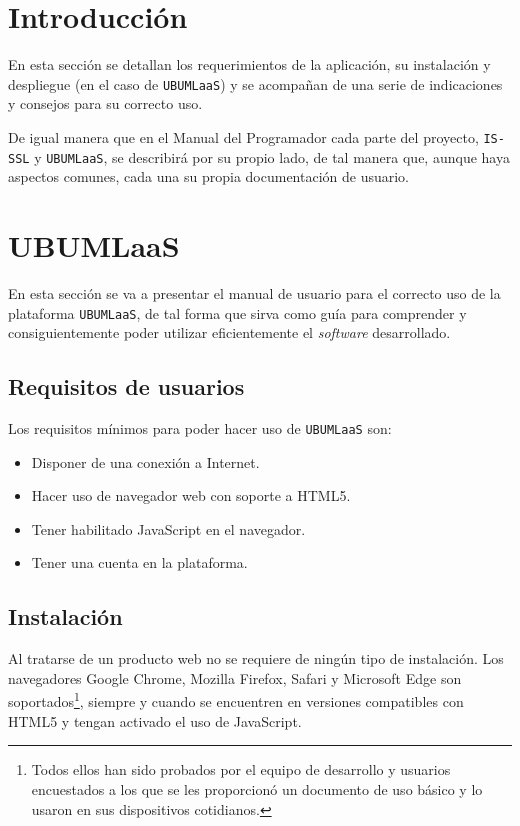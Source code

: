 
\section{Introducción}
En esta sección se detallan los requerimientos de la aplicación, su instalación y despliegue (en el caso de \texttt{UBUMLaaS}) y se acompañan de una serie de indicaciones y consejos para su correcto uso.

De igual manera que en el Manual del Programador cada parte del proyecto, \texttt{IS-SSL} y \texttt{UBUMLaaS}, se describirá por su propio lado, de tal manera que, aunque haya aspectos comunes, cada una su propia documentación de usuario.

\section{UBUMLaaS}
En esta sección se va a presentar el manual de usuario para el correcto uso de la plataforma \texttt{UBUMLaaS}, de tal forma que sirva como guía para comprender y consiguientemente poder utilizar eficientemente el \textit{software} desarrollado.
\subsection{Requisitos de usuarios}
Los requisitos mínimos para poder hacer uso de \texttt{UBUMLaaS} son:
\begin{itemize}
\item Disponer de una conexión a Internet.
\item Hacer uso de navegador web con soporte a HTML5.
\item Tener habilitado JavaScript en el navegador.
\item Tener una cuenta en la plataforma.
\end{itemize}
\subsection{Instalación}
Al tratarse de un producto web no se requiere de ningún tipo de instalación. Los navegadores Google Chrome, Mozilla Firefox, Safari y Microsoft Edge son soportados\footnote{Todos ellos han sido probados por el equipo de desarrollo y usuarios encuestados a  los que se les proporcionó un documento de uso básico y lo usaron en sus dispositivos cotidianos.}, siempre y cuando se encuentren en versiones compatibles con HTML5 y tengan activado el uso de JavaScript.

